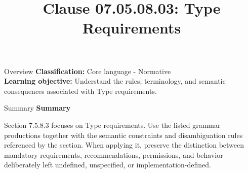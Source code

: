 \documentclass[10pt,letterpaper]{article}
\title{Clause 07.05.08.03: Type Requirements}
\author{}
\date{}
\begin{document}
\maketitle
\begin{CornellOverviewBox}{Overview}
\textbf{Classification:} Core language - Normative\\[2pt]
\textbf{Learning objective:} Understand the rules, terminology, and semantic consequences associated with Type requirements.
\end{CornellOverviewBox}\begin{CornellSummaryBox}{Summary}
{\sffamily\bfseries\color{Accent} Summary}\par\vspace{3pt}Section 7.5.8.3 focuses on Type requirements. Use the listed grammar productions together with the semantic constraints and disambiguation rules referenced by the section. When applying it, preserve the distinction between mandatory requirements, recommendations, permissions, and behavior deliberately left undefined, unspecified, or implementation-defined.
\end{CornellSummaryBox}
\end{document}
